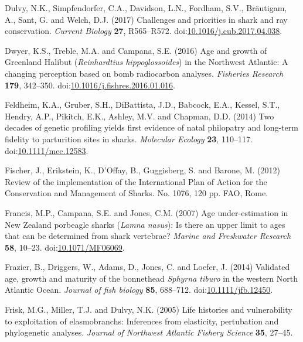 \documentclass[]{article}
\begin{document}
\hypertarget{ref-dulvy_challenges_2017}{}
Dulvy, N.K., Simpfendorfer, C.A., Davidson, L.N., Fordham, S.V.,
Bräutigam, A., Sant, G. and Welch, D.J. (2017) Challenges and priorities
in shark and ray conservation. \emph{Current Biology} \textbf{27},
R565--R572.
doi:\href{https://doi.org/10.1016/j.cub.2017.04.038}{10.1016/j.cub.2017.04.038}.

\hypertarget{ref-dwyer_age_2016}{}
Dwyer, K.S., Treble, M.A. and Campana, S.E. (2016) Age and growth of
Greenland Halibut (\emph{Reinhardtius hippoglossoides}) in the Northwest
Atlantic: A changing perception based on bomb radiocarbon analyses.
\emph{Fisheries Research} \textbf{179}, 342--350.
doi:\href{https://doi.org/10.1016/j.fishres.2016.01.016}{10.1016/j.fishres.2016.01.016}.

\hypertarget{ref-feldheim_two_2014}{}
Feldheim, K.A., Gruber, S.H., DiBattista, J.D., Babcock, E.A., Kessel,
S.T., Hendry, A.P., Pikitch, E.K., Ashley, M.V. and Chapman, D.D. (2014)
Two decades of genetic profiling yields first evidence of natal
philopatry and long-term fidelity to parturition sites in sharks.
\emph{Molecular Ecology} \textbf{23}, 110--117.
doi:\href{https://doi.org/10.1111/mec.12583}{10.1111/mec.12583}.

\hypertarget{ref-fischer_review_2012}{}
Fischer, J., Erikstein, K., D'Offay, B., Guggisberg, S. and Barone, M.
(2012) Review of the implementation of the International Plan of Action
for the Conservation and Management of Sharks. No. 1076, 120 pp. FAO,
Rome.

\hypertarget{ref-francis_age_2007}{}
Francis, M.P., Campana, S.E. and Jones, C.M. (2007) Age under-estimation
in New Zealand porbeagle sharks (\emph{Lamna nasus}): Is there an upper
limit to ages that can be determined from shark vertebrae? \emph{Marine
and Freshwater Research} \textbf{58}, 10--23.
doi:\href{https://doi.org/10.1071/MF06069}{10.1071/MF06069}.

\hypertarget{ref-frazier_validated_2014}{}
Frazier, B., Driggers, W., Adams, D., Jones, C. and Loefer, J. (2014)
Validated age, growth and maturity of the bonnethead \emph{Sphyrna
tiburo} in the western North Atlantic Ocean. \emph{Journal of fish
biology} \textbf{85}, 688--712.
doi:\href{https://doi.org/10.1111/jfb.12450}{10.1111/jfb.12450}.

\hypertarget{ref-frisk_life_2005}{}
Frisk, M.G., Miller, T.J. and Dulvy, N.K. (2005) Life histories and
vulnerability to exploitation of elasmobranchs: Inferences from
elasticity, pertubation and phylogenetic analyses. \emph{Journal of
Northwest Atlantic Fishery Science} \textbf{35}, 27--45.
\end{document}
